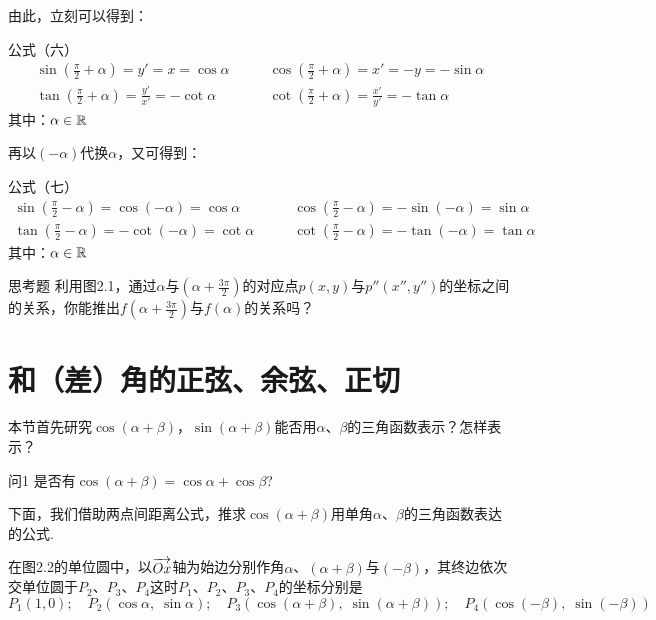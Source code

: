 由此，立刻可以得到：
\begin{thm}{公式（六）}
\[\begin{split}
\sin\left(\frac{\pi}{2}+\alpha\right)=y'=x=\cos\alpha&\qquad \cos\left(\frac{\pi}{2}+\alpha\right)=x'=-y=-\sin\alpha\\
\tan\left(\frac{\pi}{2}+\alpha\right)=\frac{y'}{x'}=-\cot\alpha &\qquad \cot\left(\frac{\pi}{2}+\alpha\right)=\frac{x'}{y'}=-\tan\alpha
\end{split}\]
其中：$\alpha\in \mathbb{R}$
\end{thm}

再以$(-\alpha)$代换$\alpha$，又可得到：
\begin{thm}{公式（七）}
\[\begin{split}
\sin\left(\frac{\pi}{2}-\alpha\right)=\cos(-\alpha)=\cos\alpha&\qquad \cos\left(\frac{\pi}{2}-\alpha\right)=-\sin(-\alpha)=\sin\alpha\\
\tan\left(\frac{\pi}{2}-\alpha\right)=-\cot(-\alpha)=\cot\alpha &\qquad \cot\left(\frac{\pi}{2}-\alpha\right)=-\tan(-\alpha)=\tan\alpha
\end{split}\]
其中：$\alpha\in \mathbb{R}$
\end{thm}

\begin{thm}{思考题}
利用图2.1，通过$\alpha$与$\left(\alpha+\frac{3\pi}{2}\right)$的对应点$p(x,y)$与$p''(x'',y'')$的坐标之间的关系，你能推出$f\left(\alpha+\frac{3\pi}{2}\right)$与$f(\alpha)$的关系吗？
\end{thm}

\section{和（差）角的正弦、余弦、正切}
本节首先研究$\cos(\alpha+\beta )$，$\sin(\alpha+\beta )$能否用$\alpha$、$\beta$的三角函数表示？怎样表示？

\begin{thm}
    {问1} 是否有$\cos(\alpha+\beta)=\cos\alpha+\cos\beta$?
\end{thm}

下面，我们借助两点间距离公式，推求$\cos(\alpha+\beta )$用单角$\alpha$、$\beta$的三角函数表达的公式.

在图2.2的单位圆中，以$\overrightarrow{Ox}$轴为始边分别作角$\alpha$、$(\alpha+\beta )$与$(-\beta)$，其终边依次交单位圆于$P_2$、$P_3$、$P_4$这时$P_1$、$P_2$、$P_3$、$P_4$的坐标分别是
\[P_1(1,0);\quad
P_2(\cos\alpha,\; \sin\alpha);\quad
P_3(\cos(\alpha+\beta ),\; \sin(\alpha+\beta ));\quad
P_4(\cos(-\beta ),\; \sin(-\beta))\]    

